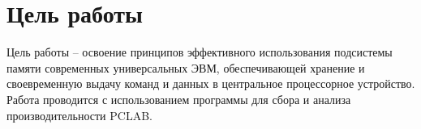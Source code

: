 \chapter*{Цель работы}

Цель работы -- освоение принципов эффективного использования подсистемы
памяти современных универсальных ЭВМ, обеспечивающей хранение и своевременную
выдачу команд и данных в центральное процессорное устройство. Работа проводится с использованием программы для сбора и анализа производительности PCLAB. 